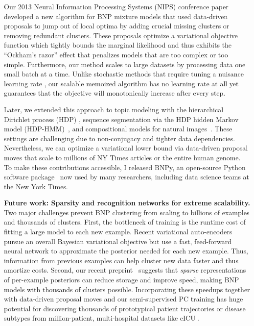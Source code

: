\documentclass[11pt,letterpaper]{article}
\begin{document}
Our 2013 Neural Information Processing Systems (NIPS) conference paper~\cite{hughes2013moVB} developed a new algorithm for BNP mixture models that used data-driven proposals to jump out of local optima by adding crucial missing clusters or removing redundant clusters. 
These proposals optimize a variational objective function which tightly bounds the marginal likelihood and thus exhibits the ``Ockham's razor'' effect that penalizes models that are too complex or too simple.
Furthermore, our method scales to large datasets by processing data one small batch at a time. Unlike stochastic methods that require tuning a nuisance learning rate \cite{hoffman2013svi}, our scalable memoized algorithm has no learning rate at all yet guarantees that the objective will monotonically increase after every step.

Later, we extended this approach to topic modeling with the hierarchical Dirichlet process (HDP) \citep{hughes2015hdpreliable}, sequence segmentation via the HDP hidden Markov model (HDP-HMM)~\citep{hughes2015hdphmm},
and compositional models for natural images~\citep{ji2017hdpgrid}.
These settings are challenging due to non-conjugacy and tighter data dependencies.
Nevertheless, we can optimize a variational lower bound via data-driven proposal moves that scale to millions of NY Times articles or the entire human genome.
To make these contributions accessible, I released BNPy, an open-source Python software package~\citep{hughes2017bnpy} now used by many researchers, including data science teams at the New York Times.

\textbf{Future work: Sparsity and recognition networks for extreme scalability.}
Two major challenges prevent BNP clustering from scaling to billions of examples and thousands of clusters. First, the bottleneck of training is the runtime cost of fitting a large model to each new example. Recent variational auto-encoders
~\citep{kingma2014autoencodingVB,mnih2014neuralVariational} 
pursue an overall Bayesian variational objective but use a 
fast, feed-forward neural network to 
approximate the posterior needed for each new example. Thus, information from previous examples can help cluster new data faster and thus amortize costs. 
Second, our recent preprint~\citep{hughes2016sparse} suggests that \emph{sparse} representations of per-example posteriors can reduce storage and improve speed, making BNP models with thousands of clusters possible.
Incorporating these speedups together with data-driven proposal moves and our
semi-supervised PC training has huge potential for 
discovering thousands of prototypical patient trajectories or disease subtypes from million-patient, multi-hospital datasets like eICU \citep{eICU}.
\end{document}
